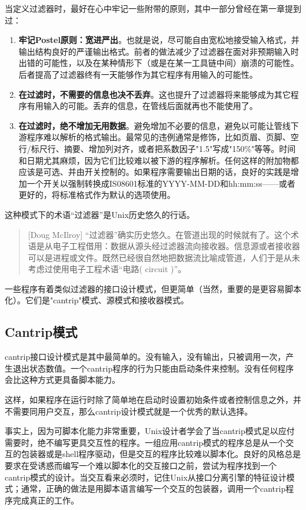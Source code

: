 \documentclass[12pt,oneside]{book}
\begin{document}
\begin{common-format}
当定义过滤器时，最好在心中牢记一些附带的原则，其中一部分曾经在第一章提到过：
\begin{enumerate}
\item \textbf{牢记Postel原则：宽进严出}。也就是说，尽可能自由宽松地接受输入格式，并输出结构良好的严谨输出格式。前者的做法减少了过滤器在面对非预期输入时出错的可能性，以及在某种情形下（或是在某一工具链中间）崩溃的可能性。后者提高了过滤器终有一天能够作为其它程序有用输入的可能性。
\item \textbf{在过滤时，不需要的信息也决不丢弃}。这也提升了过滤器将来能够成为其它程序有用输入的可能。丢弃的信息，在管线后面就再也不能使用了。
\item \textbf{在过滤时，绝不增加无用数据}。避免增加不必要的信息，避免以可能让管线下游程序难以解析的格式输出。最常见的违例通常是修饰，比如页眉、页脚、空行/标尺行、摘要、增加列对齐，或者把系数因子"1.5"写成"150\%{}"等等。时间和日期尤其麻烦，因为它们比较难以被下游的程序解析。任何这样的附加物都应该是可选、并由开关控制的。如果程序需要输出日期的话，良好的实践是增加一个开关以强制转换成IS08601标准的YYYY-MM-DD和hh:mm:ss——或者更好的，将标准格式作为默认的选项使用。
\end{enumerate}

这种模式下的术语“过滤器”是Unix历史悠久的行话。

\begin{quote}[Doug McIlroy]
“过滤器”确实历史悠久。在管道出现的时候就有了。这个术语是从电子工程借用：数据从源头经过滤器流向接收器。信息源或者接收器可以是进程或文件。既然已经很自然地把数据流比喻成管道，人们于是从未考虑过使用电子工程术语“电路( circuit )”。
\end{quote}

一些程序有着类似过滤器的接口设计模式，但更简单（当然，重要的是更容易脚本化）。它们是"cantrip"模式、源模式和接收器模式。


\subsection{Cantrip模式}
cantrip接口设计模式是其中最简单的。没有输入，没有输出，只被调用一次，产生退出状态数值。一个cantrip程序的行为只能由启动条件来控制。没有任何程序会比这种方式更具备脚本能力。

这样，如果程序在运行时除了简单地在启动时设置初始条件或者控制信息之外，并不需要同用户交互，那么cantrip设计模式就是一个优秀的默认选择。

事实上，因为可脚本化能力非常重要，Unix设计者学会了当cantrip模式足以应付需要时，绝不编写更具交互性的程序。一组应用cantrip模式的程序总是从一个交互的包装器或是shell程序驱动，但是交互的程序比较难以脚本化。良好的风格总是要求在受诱惑而编写一个难以脚本化的交互接口之前，尝试为程序找到一个cantrip模式的设计。当交互看来必须时，记住Unix从接口分离引擎的特征设计模式；通常，正确的做法是用脚本语言编写一个交互的包装器，调用一个cantrip程序完成真正的工作。


\end{common-format}
\end{document}
